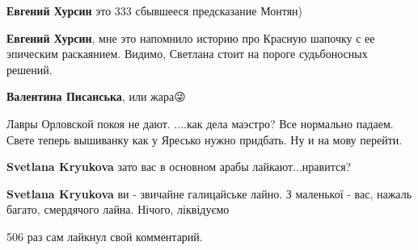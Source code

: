\begin{itemize}
\begin{itemize}
\textbf{Евгений Хурсин} это 333 сбывшееся предсказание Монтян)

 
\textbf{Евгений Хурсин}, мне это напомнило историю про Красную шапочку с ее эпическим раскаянием. Видимо, Светлана стоит на пороге судьбоносных решений.

 
\textbf{Валентина Писанська}, или жара😜

 
Лавры Орловской покоя не дают. ....как дела маэстро? Все нормально падаем. Свете теперь вышиванку как у Яресько нужно придбать. Ну и на мову перейти.

 
\textbf{Svetlana Kryukova} зато вас в основном арабы лайкают...нравится?

 
\textbf{Svetlana Kryukova} ви - звичайне галицайське лайно. З маленької - вас, нажаль багато, смердячого лайна. Нічого, ліквідуємо

 
506 раз сам лайкнул свой комментарий.\Laughey[1.0][white]


\end{itemize}
\end{itemize}
